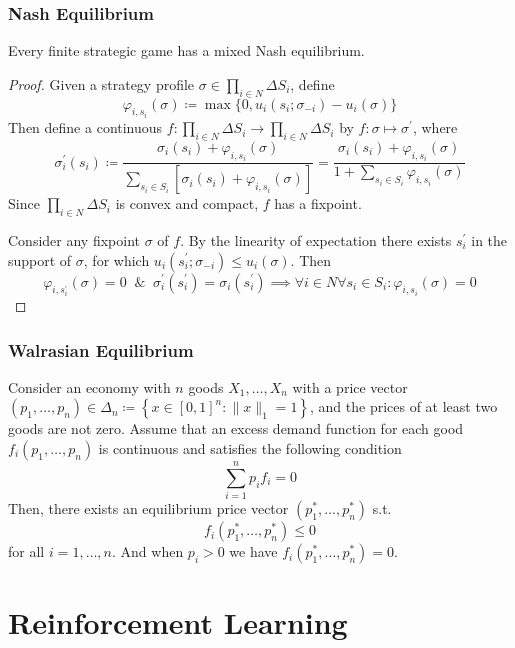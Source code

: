 \documentclass[UTF8,11pt,colorlinks,compress,openany]{beamer}%
\begin{document}
\begin{frame}\frametitle{Nash Equilibrium}
\setlength\abovedisplayskip{0pt}
\setlength\belowdisplayskip{0pt}
\begin{theorem}
	Every finite strategic game has a mixed Nash equilibrium.
\end{theorem}
\begin{proof}
	Given a strategy profile $\sigma\in\prod\limits_{i\in N}\Delta S_i$, define
	\[\varphi_{i,s_i}(\sigma)\coloneqq \max\big\{0,u_i(s_i;\sigma_{-i})-u_i(\sigma)\big\}\]
	Then define a continuous $f: \prod\limits_{i\in N}\Delta S_i\to\prod\limits_{i\in N}\Delta S_i$ by $f: \sigma\mapsto\sigma^\prime$, where
	\[
	\sigma_i^\prime(s_i)\coloneqq \dfrac{\sigma_i(s_i)+\varphi_{i,s_i}(\sigma)}{\sum\limits_{s_i\in S_i}\left[\sigma_i(s_i)+\varphi_{i,s_i}(\sigma)\right]}=\dfrac{\sigma_i(s_i)+\varphi_{i,s_i}(\sigma)}{1+\sum\limits_{s_i\in S_i}\varphi_{i,s_i}(\sigma)}
	\]
	Since $\prod\limits_{i\in N}\Delta S_i$ is convex and compact, $f$ has a fixpoint.

	Consider any fixpoint $\sigma$ of $f$. By the linearity of expectation there exists $s_i^\prime$ in the support of $\sigma$, for which $u_i(s_i^\prime;\sigma_{-i})\leq u_i(\sigma)$. Then
	\[\varphi_{i,s_i^\prime}(\sigma)=0\;\;\&\;\;\sigma_i^\prime(s_i^\prime)=\sigma_i(s_i^\prime)\implies\forall i\in N\forall s_i\in S_i: \varphi_{i,s_i}(\sigma)=0\]
\end{proof}
\end{frame}

\begin{frame}\frametitle{Walrasian Equilibrium}
\begin{theorem}
Consider an economy with $n$ goods $X_1,\dots, X_n$ with a price vector $(p_1,\dots, p_n)\in\Delta_n\coloneqq \left\{x\in[0,1]^n:\|x\|_1=1\right\}$, and the prices of at least two goods are not zero. Assume that an excess demand function for each good $f_i(p_1,\dots, p_n)$ is continuous and satisfies the following condition
\[\sum\limits_{i=1}^n p_if_i=0\tag{Walras Law}\]
Then, there exists an equilibrium price vector $(p_1^*,\dots,p_n^*)$ s.t.
\[f_i(p_1^*,\dots,p_n^*)\leq 0\]
for all $i=1,\dots,n$. And when $p_i>0$ we have $f_i(p_1^*,\dots,p_n^*)=0$.
\end{theorem}
\end{frame}

\section{Reinforcement Learning}
\end{document}
